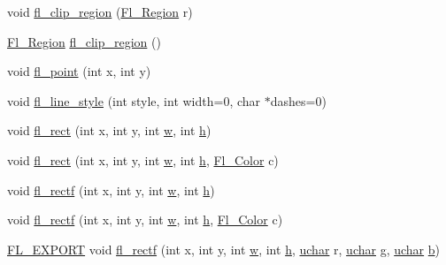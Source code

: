 \begin{DoxyCompactItemize}
void \hyperlink{group__fl__drawings_gab12cb4aaa22092a0f2ae3d349c57f234}{fl\+\_\+clip\+\_\+region} (\hyperlink{mac_8_h_ac80c9f95cc93c989c5a953a749f45cb6}{Fl\+\_\+\+Region} r)
\item 
\hyperlink{mac_8_h_ac80c9f95cc93c989c5a953a749f45cb6}{Fl\+\_\+\+Region} \hyperlink{group__fl__drawings_ga259fc45a0997b1bae7660c01af943457}{fl\+\_\+clip\+\_\+region} ()
\item 
void \hyperlink{group__fl__drawings_ga2145abaa848e9ce2da4d566b0dc54f6f}{fl\+\_\+point} (int x, int y)
\item 
void \hyperlink{group__fl__drawings_ga75ac53c05a97bbb01a22ff56a382f52d}{fl\+\_\+line\+\_\+style} (int style, int width=0, char $\ast$dashes=0)
\item 
void \hyperlink{group__fl__drawings_ga690c83e11f49fa837b563f4c0bc4fd1b}{fl\+\_\+rect} (int x, int y, int \hyperlink{forms_8_h_aac374e320caaadeca4874add33b62af2}{w}, int \hyperlink{forms_8_h_a7e427ba5b307f9068129699250690066}{h})
\item 
void \hyperlink{group__fl__drawings_gae09f4c1d37871f3530229ede20631d1e}{fl\+\_\+rect} (int x, int y, int \hyperlink{forms_8_h_aac374e320caaadeca4874add33b62af2}{w}, int \hyperlink{forms_8_h_a7e427ba5b307f9068129699250690066}{h}, \hyperlink{_enumerations_8_h_a8b762953646f8abee866061f1af78a6a}{Fl\+\_\+\+Color} c)
\item 
void \hyperlink{group__fl__drawings_ga2986a868e9cc8d9141acde94c0fe8ab0}{fl\+\_\+rectf} (int x, int y, int \hyperlink{forms_8_h_aac374e320caaadeca4874add33b62af2}{w}, int \hyperlink{forms_8_h_a7e427ba5b307f9068129699250690066}{h})
\item 
void \hyperlink{group__fl__drawings_gafa5637e67e69fd6ebfc471619d856dab}{fl\+\_\+rectf} (int x, int y, int \hyperlink{forms_8_h_aac374e320caaadeca4874add33b62af2}{w}, int \hyperlink{forms_8_h_a7e427ba5b307f9068129699250690066}{h}, \hyperlink{_enumerations_8_h_a8b762953646f8abee866061f1af78a6a}{Fl\+\_\+\+Color} c)
\item 
\hyperlink{_fl___export_8_h_aa9ba29a18aee9d738370a06eeb4470fc}{F\+L\+\_\+\+E\+X\+P\+O\+RT} void \hyperlink{group__fl__drawings_ga5ef1c09ef349f5fe128536c8434d514d}{fl\+\_\+rectf} (int x, int y, int \hyperlink{forms_8_h_aac374e320caaadeca4874add33b62af2}{w}, int \hyperlink{forms_8_h_a7e427ba5b307f9068129699250690066}{h}, \hyperlink{fl__types_8h_a65f85814a8290f9797005d3b28e7e5fc}{uchar} r, \hyperlink{fl__types_8h_a65f85814a8290f9797005d3b28e7e5fc}{uchar} g, \hyperlink{fl__types_8h_a65f85814a8290f9797005d3b28e7e5fc}{uchar} \hyperlink{forms_8_h_a0ba06a290a384fa06b1b90745827dae2}{b})

\end{DoxyCompactItemize}
